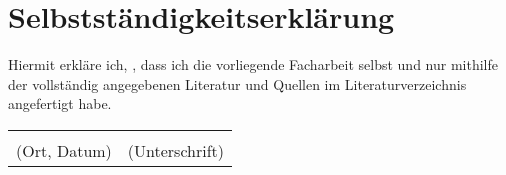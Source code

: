 \section{Selbstständigkeitserklärung}

Hiermit erkläre ich, \underline{\hspace{5cm}}, dass ich die vorliegende Facharbeit selbst und nur mithilfe 
der vollständig angegebenen Literatur und Quellen im Literaturverzeichnis angefertigt habe.

\vspace{2.5cm}

\begin{tabular}{ll}
    \centering
    \underline{\hspace{6cm}}&\underline{\hspace{6cm}}\\
    (Ort, Datum)&(Unterschrift)\\ 
\end{tabular}